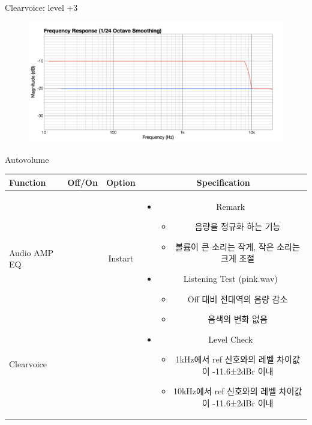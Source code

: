 \documentclass{beamer}
\begin{document}
\begin{frame}[t]{Clearvoice: level +3}
		\begin{figure}[b]
			\includegraphics[height=0.32\textwidth]{figure/cv3.png}
		\end{figure}
		
	\end{frame}
	
	
	\begin{frame}[t]{Autovolume}
		\begin{tiny}
			\begin{tabular}{@{}lccc@{}}
				\toprule
				Function & Off/On & Option & Specification \\
				\midrule
				Audio AMP EQ & \color{black}{Off} & Instart &
				\multirow{14}{60mm}{
					\begin{itemize}
						\item Remark
						\begin{itemize}
							\item 음량을 정규화 하는 기능
							\item 볼륨이 큰 소리는 작게, 작은 소리는 크게 조절
						\end{itemize}
						\item Listening Test (pink.wav)
						\begin{itemize}
							\item Off 대비 전대역의 음량 감소
							\item 음색의 변화 없음
						\end{itemize}
						\item Level Check
						\begin{itemize}
							\item 1kHz에서 ref 신호와의 레벨 차이값이 -11.6±2dBr 이내
							\item 10kHz에서 ref 신호와의 레벨 차이값이 -11.6±2dBr 이내
						\end{itemize}
					\end{itemize}
				} \\
				Clearvoice & \color{black}{Off} & & \\
				\color{blue}{Autovolume} & \color{blue}{On} & & \\

\end{tabular}
\end{tiny}
\end{frame}
\end{document}

